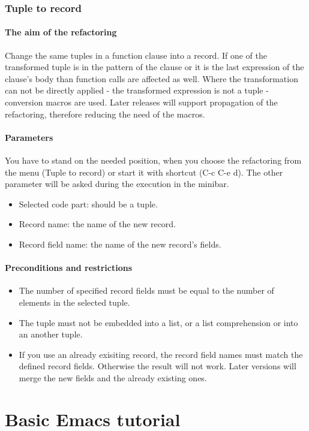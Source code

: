 \documentclass[12pt]{article}
\begin{document}
\subsubsection{Tuple to record}
\paragraph{The aim of the refactoring}
Change the same tuples in a function clause into a record. If one of the transformed tuple is in the pattern of the clause or it is the last expression of the  clause's body than function calls are affected as well. Where the transformation can not be directly applied - the transformed expression is not a tuple - conversion macros are used. Later releases will support propagation of the refactoring, therefore reducing the need of the macros.

\paragraph{Parameters}
You have to stand on the needed position, when you choose the refactoring from the menu (Tuple to record) 
or start it with shortcut (C-c C-e d).
The other parameter will be asked during the execution in the minibar.
\begin{itemize}
	\item Selected code part: should be a tuple.
	\item Record name: the name of the new record. 
	\item Record field name: the name of the new record's fields. 
\end{itemize}
\paragraph{Preconditions and restrictions}
\begin{itemize}
	\item The number of specified record fields must be equal to the number of
	elements in the selected tuple.
	\item The tuple must not be embedded into a list, or a list comprehension or into an another tuple.
	\item If you use an already exisiting record, the record field names must match the defined record
	fields. Otherwise the result will not work. Later versions will merge the new fields and the already
	existing ones.
\end{itemize}

\section{Basic Emacs tutorial}
\label{emacs}
\end{document}
